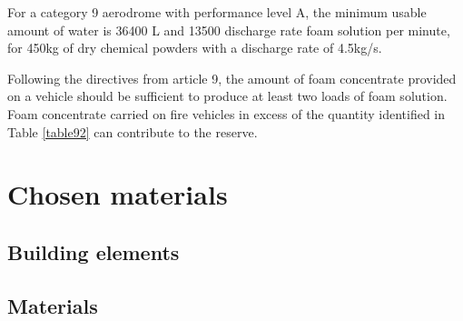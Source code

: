 	For a category 9 aerodrome with performance level A, the minimum usable amount of water is 36400 L and 13500 discharge rate foam solution per minute, for 450kg of dry chemical powders with a discharge rate of 4.5kg/s.

	Following the directives from article 9, the amount of foam concentrate provided on a vehicle should be sufficient to produce at least two loads of foam solution. Foam concentrate carried on fire vehicles in excess of the quantity identified in Table \ref{table92} can contribute to the reserve.
\section{Chosen materials}
		\subsection{Building elements}
		\subsection{Materials}